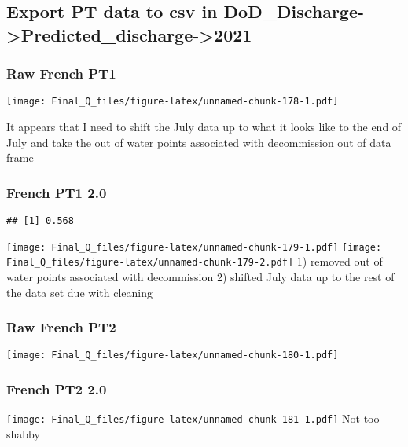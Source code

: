 \documentclass[
]{article}
\begin{document}
\hypertarget{export-pt-data-to-csv-in-dod_discharge-predicted_discharge-2021}{%
\subsection{Export PT data to csv in
DoD\_Discharge-\textgreater Predicted\_discharge-\textgreater2021}\label{export-pt-data-to-csv-in-dod_discharge-predicted_discharge-2021}}

\hypertarget{raw-french-pt1-2}{%
\subsubsection{Raw French PT1}\label{raw-french-pt1-2}}

\texttt{[image: Final\_Q\_files/figure-latex/unnamed-chunk-178-1.pdf]}

It appears that I need to shift the July data up to what it looks like
to the end of July and take the out of water points associated with
decommission out of data frame

\hypertarget{french-pt1-2.0-2}{%
\subsubsection{French PT1 2.0}\label{french-pt1-2.0-2}}

\begin{verbatim}
## [1] 0.568
\end{verbatim}

\texttt{[image: Final\_Q\_files/figure-latex/unnamed-chunk-179-1.pdf]}
\texttt{[image: Final\_Q\_files/figure-latex/unnamed-chunk-179-2.pdf]} 1)
removed out of water points associated with decommission 2) shifted July
data up to the rest of the data set due with cleaning

\hypertarget{raw-french-pt2-2}{%
\subsubsection{Raw French PT2}\label{raw-french-pt2-2}}

\texttt{[image: Final\_Q\_files/figure-latex/unnamed-chunk-180-1.pdf]}

\hypertarget{french-pt2-2.0}{%
\subsubsection{French PT2 2.0}\label{french-pt2-2.0}}

\texttt{[image: Final\_Q\_files/figure-latex/unnamed-chunk-181-1.pdf]} Not
too shabby
\end{document}
